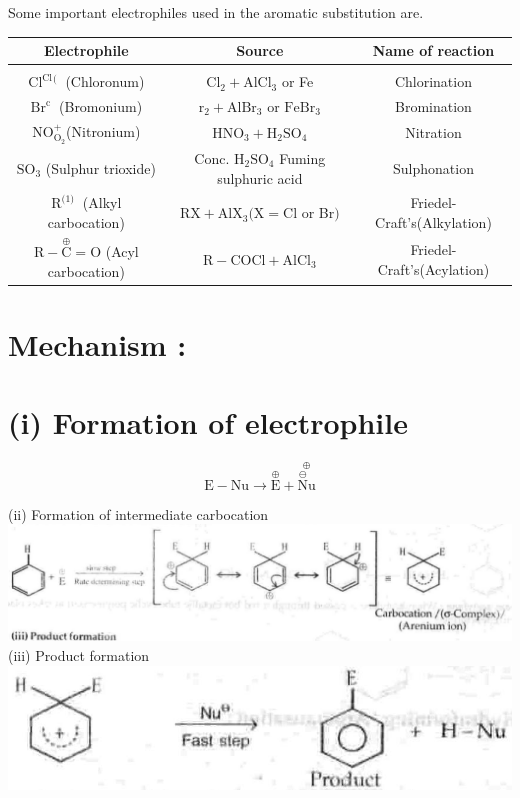 \documentclass[10pt]{article}
\begin{document}
Some important electrophiles used in the aromatic substitution are.

\begin{center}
\begin{tabular}{|c|c|c|}
\hline
Electrophile & Source & Name of reaction \\
\hline
 &  &  \\
\hline
$\mathrm{Cl}^{\mathrm{Cl}}{ }^{\text {( }}$ (Chloronum) & $\mathrm{Cl}_{2}+\mathrm{AlCl}_{3}$ or Fe & Chlorination \\
\hline
$\mathrm{Br}^{\text {c }}$ (Bromonium) & $\mathrm{r}_{2}+\mathrm{AlBr}_{3}$ or $\mathrm{FeBr}_{3}$ & Bromination \\
\hline
$\mathrm{NO}_{\mathrm{O}_{2}}^{+}$(Nitronium) & $\mathrm{HNO}_{3}+\mathrm{H}_{2} \mathrm{SO}_{4}$ & Nitration \\
\hline
$\mathrm{SO}_{3}$ (Sulphur trioxide) & Conc. $\mathrm{H}_{2} \mathrm{SO}_{4}$ Fuming sulphuric acid & Sulphonation \\
\hline
$\mathrm{R}^{\text {(1) }}$ (Alkyl carbocation) & $\mathrm{RX}+\mathrm{AlX}_{3}(\mathrm{X}=\mathrm{Cl}$ or Br$)$ & Friedel-Craft's(Alkylation) \\
\hline
$\mathrm{R}-\stackrel{\oplus}{\mathrm{C}}=\mathrm{O}$ (Acyl carbocation) & $\mathrm{R}-\mathrm{COCl}+\mathrm{AlCl}_{3}$ & Friedel-Craft's(Acylation) \\
\hline
\end{tabular}
\end{center}

\section*{Mechanism :}
\section*{(i) Formation of electrophile}
$$
\mathrm{E}-\mathrm{Nu} \longrightarrow \stackrel{\oplus}{\mathrm{E}}+\stackrel{\oplus}{\stackrel{\ominus}{\mathrm{N}} \mathrm{u}}
$$

(ii) Formation of intermediate carbocation\\
\includegraphics[max width=\textwidth, center]{2025_01_28_8470952b98110cec3aabg-206(2)}\\
(iii) Product formation\\
\includegraphics[max width=\textwidth, center]{2025_01_28_8470952b98110cec3aabg-206}
\end{document}
